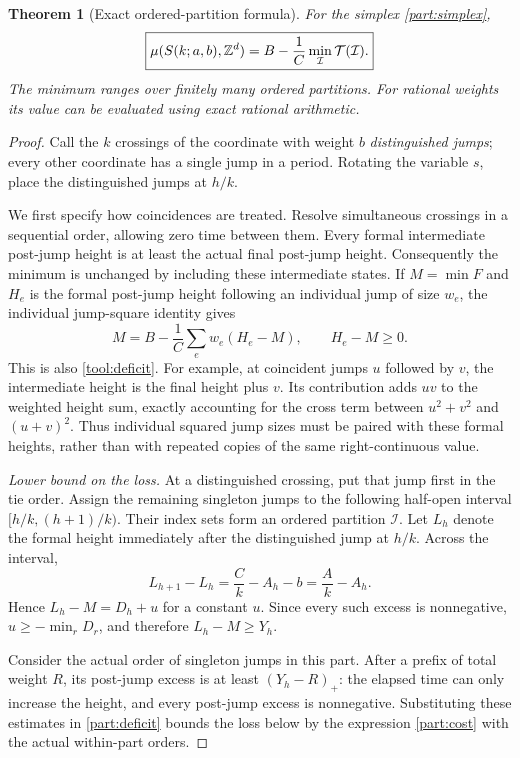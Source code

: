 \documentclass[11pt,a4paper]{article}
\newtheorem{theorem}{Theorem}[section]
\theoremstyle{remark}\newtheorem{remark}[theorem]{Remark}
\begin{document}
\begin{theorem}[Exact ordered-partition formula]\label{part:exact}
For the simplex \eqref{part:simplex},
\begin{equation}\label{part:exacteq}
 \boxed{\displaystyle
 \mu(S(k;a,b),\mathbb Z^d)
 =B-\frac1C\min_{\mathcal I}\mathcal T(\mathcal I).}
\end{equation}
The minimum ranges over finitely many ordered partitions.  For
rational weights its value can be evaluated using exact rational
arithmetic.
\end{theorem}

\begin{proof}
Call the $k$ crossings of the coordinate with weight $b$
\emph{distinguished jumps}; every other coordinate has a single
jump in a period.  Rotating the variable $s$, place the distinguished
jumps at $h/k$.

We first specify how coincidences are treated.  Resolve simultaneous
crossings in a sequential order, allowing zero time between them.
Every formal intermediate post-jump height is at least the actual
final post-jump height.  Consequently the minimum is unchanged by
including these intermediate states.  If $M=\min F$ and $H_e$ is
the formal post-jump height following an individual jump of size
$w_e$, the individual jump-square identity gives
\begin{equation}\label{part:deficit}
 M=B-\frac1C\sum_e w_e(H_e-M),\qquad H_e-M\ge0.
\end{equation}
This is also \eqref{tool:deficit}.  For example, at coincident jumps
$u$ followed by $v$, the intermediate height is the final height
plus $v$.  Its contribution adds $uv$ to the weighted height sum,
exactly accounting for the cross term between $u^2+v^2$ and
$(u+v)^2$.  Thus individual squared jump sizes must be paired with
these formal heights, rather than with repeated copies of the same
right-continuous value.

\emph{Lower bound on the loss.}
At a distinguished crossing, put that jump first in the tie order.
Assign the remaining singleton jumps to the following half-open
interval $[h/k,(h+1)/k)$.  Their index sets form an ordered
partition $\mathcal I$.  Let $L_h$ denote the formal height
immediately after the distinguished jump at $h/k$.  Across the
interval,
\[
 L_{h+1}-L_h=\frac Ck-A_h-b=\frac Ak-A_h.
\]
Hence $L_h-M=D_h+u$ for a constant $u$.  Since every such excess
is nonnegative, $u\ge-\min_rD_r$, and therefore
$L_h-M\ge Y_h$.

Consider the actual order of singleton jumps in this part.  After
a prefix of total weight $R$, its post-jump excess is at least
$(Y_h-R)_+$: the elapsed time can only increase the height, and
every post-jump excess is nonnegative.  Substituting these estimates
in \eqref{part:deficit} bounds the loss below by the expression
\eqref{part:cost} with the actual within-part orders.


\end{proof}
\end{document}
